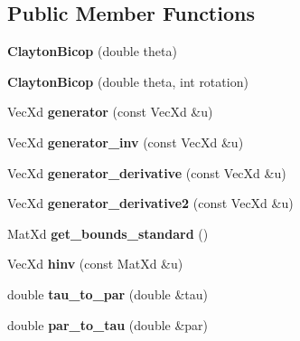 \subsection*{Public Member Functions}
\begin{DoxyCompactItemize}
\item 
\hypertarget{class_clayton_bicop_a6e3b29b40f19424886c0f4b673977515}{{\bfseries Clayton\+Bicop} (double theta)}\label{class_clayton_bicop_a6e3b29b40f19424886c0f4b673977515}

\item 
\hypertarget{class_clayton_bicop_a225581e47b5c1047091be8cc070fcdae}{{\bfseries Clayton\+Bicop} (double theta, int rotation)}\label{class_clayton_bicop_a225581e47b5c1047091be8cc070fcdae}

\item 
\hypertarget{class_clayton_bicop_a9763aabca37806261b8ecd6c46f4cf95}{Vec\+Xd {\bfseries generator} (const Vec\+Xd \&u)}\label{class_clayton_bicop_a9763aabca37806261b8ecd6c46f4cf95}

\item 
\hypertarget{class_clayton_bicop_a295caa6493575640a96201414dbf398f}{Vec\+Xd {\bfseries generator\+\_\+inv} (const Vec\+Xd \&u)}\label{class_clayton_bicop_a295caa6493575640a96201414dbf398f}

\item 
\hypertarget{class_clayton_bicop_ab009f6aa6036ad92d83a3d185e6234d8}{Vec\+Xd {\bfseries generator\+\_\+derivative} (const Vec\+Xd \&u)}\label{class_clayton_bicop_ab009f6aa6036ad92d83a3d185e6234d8}

\item 
\hypertarget{class_clayton_bicop_af24c631fbf12bcf3f52724fcf926cfef}{Vec\+Xd {\bfseries generator\+\_\+derivative2} (const Vec\+Xd \&u)}\label{class_clayton_bicop_af24c631fbf12bcf3f52724fcf926cfef}

\item 
\hypertarget{class_clayton_bicop_a087f50080b50c8ae0c545b7b182ba983}{Mat\+Xd {\bfseries get\+\_\+bounds\+\_\+standard} ()}\label{class_clayton_bicop_a087f50080b50c8ae0c545b7b182ba983}

\item 
\hypertarget{class_clayton_bicop_a3de44e26cffcac6d7e2511cc1ad56b04}{Vec\+Xd {\bfseries hinv} (const Mat\+Xd \&u)}\label{class_clayton_bicop_a3de44e26cffcac6d7e2511cc1ad56b04}

\item 
\hypertarget{class_clayton_bicop_a86b6e4ba35a2563b826b7811e7de3b47}{double {\bfseries tau\+\_\+to\+\_\+par} (double \&tau)}\label{class_clayton_bicop_a86b6e4ba35a2563b826b7811e7de3b47}

\item 
\hypertarget{class_clayton_bicop_a874e76cdb70e2e6ad2ee27596f3bfdc2}{double {\bfseries par\+\_\+to\+\_\+tau} (double \&par)}\label{class_clayton_bicop_a874e76cdb70e2e6ad2ee27596f3bfdc2}

\end{DoxyCompactItemize}
